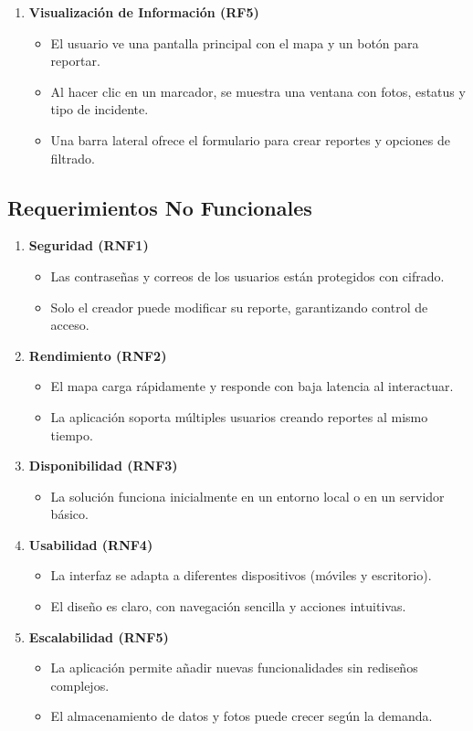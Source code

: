 \begin{enumerate}
    \item \textbf{Visualización de Información (RF5)}
    \begin{itemize}
        \item El usuario ve una pantalla principal con el mapa y un botón para reportar.
        \item Al hacer clic en un marcador, se muestra una ventana con fotos, estatus y tipo de incidente.
        \item Una barra lateral ofrece el formulario para crear reportes y opciones de filtrado.
    \end{itemize}
\end{enumerate}

\subsection*{Requerimientos No Funcionales}

\begin{enumerate}
    \item \textbf{Seguridad (RNF1)}
    \begin{itemize}
        \item Las contraseñas y correos de los usuarios están protegidos con cifrado.
        \item Solo el creador puede modificar su reporte, garantizando control de acceso.
    \end{itemize}

    \item \textbf{Rendimiento (RNF2)}
    \begin{itemize}
        \item El mapa carga rápidamente y responde con baja latencia al interactuar.
        \item La aplicación soporta múltiples usuarios creando reportes al mismo tiempo.
    \end{itemize}

    \item \textbf{Disponibilidad (RNF3)}
    \begin{itemize}
        \item La solución funciona inicialmente en un entorno local o en un servidor básico.
    \end{itemize}

    \item \textbf{Usabilidad (RNF4)}
    \begin{itemize}
        \item La interfaz se adapta a diferentes dispositivos (móviles y escritorio).
        \item El diseño es claro, con navegación sencilla y acciones intuitivas.
    \end{itemize}

    \item \textbf{Escalabilidad (RNF5)}
    \begin{itemize}
        \item La aplicación permite añadir nuevas funcionalidades sin rediseños complejos.
        \item El almacenamiento de datos y fotos puede crecer según la demanda.
    \end{itemize}
\end{enumerate}